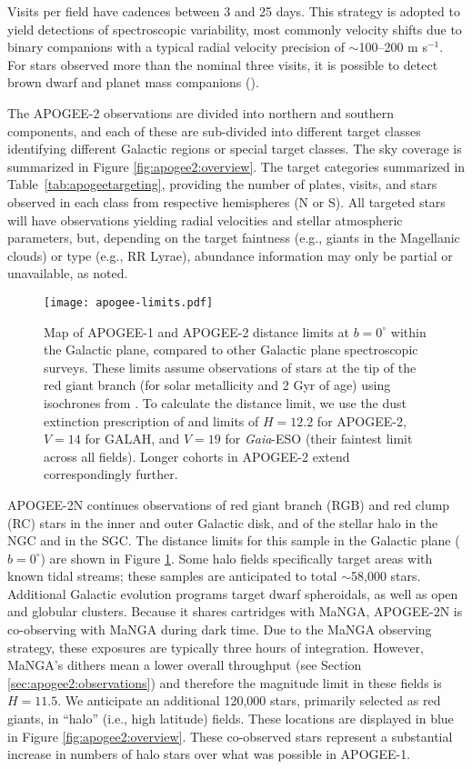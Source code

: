 Visits per field have cadences between 3 and 25 days. This strategy is
adopted to yield detections of spectroscopic variability, most
commonly velocity shifts due to binary companions with a typical
radial velocity precision of $\sim$100--200 m s$^{-1}$.  For stars
observed more than the nominal three visits, it is possible to detect
brown dwarf and planet mass companions (\citealt{fleming15a,
  troup16a}).

The APOGEE-2 observations are divided into northern and southern
components, and each of these are sub-divided into different target
classes identifying different Galactic regions or special target
classes. The sky coverage is summarized in Figure
\ref{fig:apogee2:overview}. The target categories summarized in
Table~\ref{tab:apogeetargeting}, providing the number of plates,
visits, and stars observed in each class from respective hemispheres
(N or S). All targeted stars will have observations yielding radial
velocities and stellar atmospheric parameters, but, depending on the
target faintness (e.g., giants in the Magellanic clouds) or type
(e.g., RR Lyrae), abundance information may only be partial or
unavailable, as noted.

\begin{figure}[t!]
\centering
\texttt{[image: apogee-limits.pdf]}
\caption{ \label{fig:apogee2-galaxy} Map of APOGEE-1 and APOGEE-2
  distance limits at $b=0^\circ$ within the Galactic plane, compared
  to other Galactic plane spectroscopic surveys. These limits assume
  observations of stars at the tip of the red giant branch (for
  solar metallicity and 2 Gyr of age) using isochrones from
  \citet{bressan12a}. To calculate the distance limit, we use the dust
  extinction prescription of \citet{bovy16a} and limits of $H=12.2$
  for APOGEE-2, $V=14$ for GALAH, and $V=19$ for {\it Gaia}-ESO (their
  faintest limit across all fields). Longer cohorts in APOGEE-2 
  extend correspondingly further.}
\end{figure}

APOGEE-2N continues observations of red giant branch (RGB) and red
clump (RC) stars in the inner and outer Galactic disk, and of the
stellar halo in the NGC and in the SGC. The distance limits for this
sample in the Galactic plane ($b=0^\circ$) are shown in Figure
\ref{fig:apogee2-galaxy}. Some halo fields specifically target areas
with known tidal streams; these samples are anticipated to total
$\sim$58,000 stars.  Additional Galactic evolution programs target
dwarf spheroidals, as well as open and globular clusters. Because it
shares cartridges with MaNGA, APOGEE-2N is co-observing with MaNGA
during dark time. Due to the MaNGA observing strategy, these exposures
are typically three hours of integration.  However, MaNGA's dithers
mean a lower overall throughput (see Section
\ref{sec:apogee2:observations}) and therefore the magnitude limit in
these fields is $H=11.5$.  We anticipate an additional 120,000 stars,
primarily selected as red giants, in ``halo'' (i.e., high latitude)
fields. These locations are displayed in blue in Figure
\ref{fig:apogee2:overview}. These co-observed stars represent a
substantial increase in numbers of halo stars over what was possible
in APOGEE-1.

